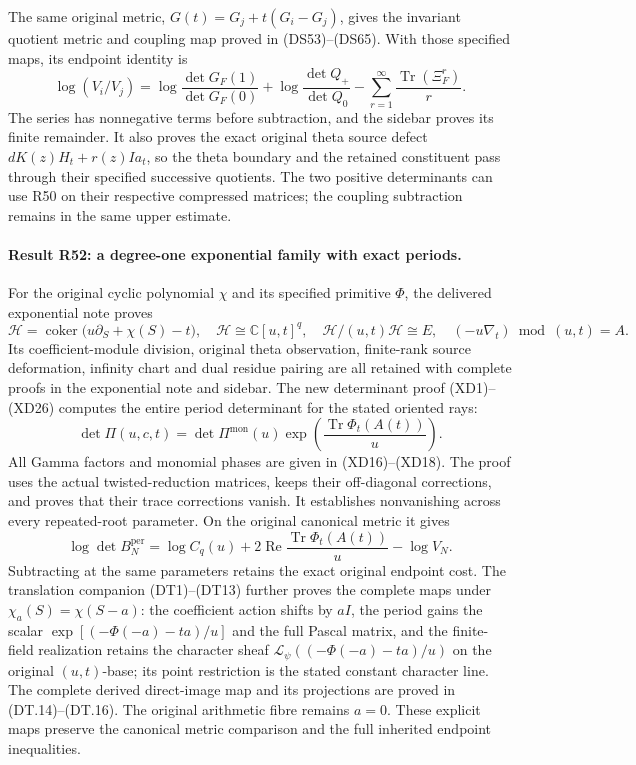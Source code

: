 The same original metric, \(G(t)=G_j+t(G_i-G_j)\), gives the invariant
quotient metric and coupling map proved in (DS53)--(DS65). With those
specified maps, its endpoint identity is
\[
 \log(V_i/V_j)=
 \log\frac{\det G_F(1)}{\det G_F(0)}
 +\log\frac{\det Q_+}{\det Q_0}
 -\sum_{r=1}^{\infty}\frac{\operatorname{Tr}(\Xi_F^r)}r.
\]
The series has nonnegative terms before subtraction, and the sidebar
proves its finite remainder. It also proves the exact original theta
source defect
\(dK(z)H_t+r(z)Ia_t\), so the theta boundary and the retained
constituent pass through their specified successive quotients.
The two positive determinants can use R50 on their respective
compressed matrices; the coupling subtraction remains in the same
upper estimate.

\paragraph{Result R52: a degree-one exponential family with exact periods.}
For the original cyclic polynomial \(\chi\) and its specified primitive
\(\Phi\), the delivered exponential note proves
\[
 \mathcal H=\operatorname{coker}
 \bigl(u\partial_S+\chi(S)-t\bigr),\quad
 \mathcal H\cong\mathbb C[u,t]^q,\quad
 \mathcal H/(u,t)\mathcal H\cong E,
 \quad(-u\nabla_t)\bmod(u,t)=A.
\]
Its coefficient-module division, original theta observation,
finite-rank source deformation, infinity chart and dual residue
pairing are all retained with complete proofs in the exponential
note and sidebar. The new determinant proof (XD1)--(XD26) computes
the entire period determinant for the stated oriented rays:
\[
 \det\Pi(u,c,t)=\det\Pi^{\mathrm{mon}}(u)
       \exp\!\left(\frac{\operatorname{Tr}\Phi_t(A(t))}{u}\right).
\]
All Gamma factors and monomial phases are given in (XD16)--(XD18).
The proof uses the actual twisted-reduction matrices, keeps their
off-diagonal corrections, and proves that their trace corrections
vanish. It establishes nonvanishing across every repeated-root
parameter. On the original canonical metric it gives
\[
 \log\det B_N^{\mathrm{per}}=
 \log C_q(u)+2\operatorname{Re}
       \frac{\operatorname{Tr}\Phi_t(A(t))}{u}-\log V_N.
\]
Subtracting at the same parameters retains the exact original
endpoint cost. The translation companion (DT1)--(DT13) further
proves the complete maps under \(\chi_a(S)=\chi(S-a)\): the
coefficient action shifts by \(aI\), the period gains the scalar
\(\exp[(-\Phi(-a)-ta)/u]\) and the full Pascal matrix, and the
finite-field realization retains the character sheaf
\(\mathcal L_\psi((-\Phi(-a)-ta)/u)\) on the original
\((u,t)\)-base; its point restriction is the stated constant
character line. The complete derived direct-image map and
its projections are proved in (DT.14)--(DT.16). The original arithmetic fibre
remains \(a=0\). These explicit maps preserve the canonical metric
comparison and the full inherited endpoint inequalities.

